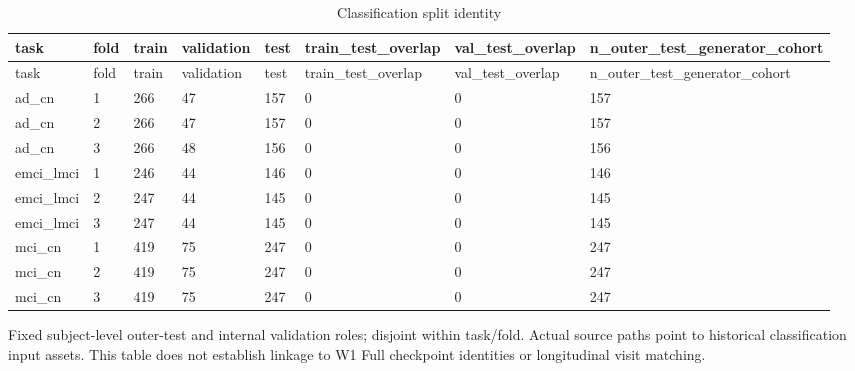 \begingroup
\footnotesize
\setlength{\tabcolsep}{4pt}
\begin{longtable}{llllllll}
\caption{Classification split identity}\label{tab:s-n22}\\
\toprule
task & fold & train & validation & test & train\_test\_overlap & val\_test\_overlap & n\_outer\_test\_generator\_cohort \\
\midrule
\endfirsthead
\toprule
task & fold & train & validation & test & train\_test\_overlap & val\_test\_overlap & n\_outer\_test\_generator\_cohort \\
\midrule
\endhead
\bottomrule
\endfoot
ad\_cn & 1 & 266 & 47 & 157 & 0 & 0 & 157 \\
ad\_cn & 2 & 266 & 47 & 157 & 0 & 0 & 157 \\
ad\_cn & 3 & 266 & 48 & 156 & 0 & 0 & 156 \\
emci\_lmci & 1 & 246 & 44 & 146 & 0 & 0 & 146 \\
emci\_lmci & 2 & 247 & 44 & 145 & 0 & 0 & 145 \\
emci\_lmci & 3 & 247 & 44 & 145 & 0 & 0 & 145 \\
mci\_cn & 1 & 419 & 75 & 247 & 0 & 0 & 247 \\
mci\_cn & 2 & 419 & 75 & 247 & 0 & 0 & 247 \\
mci\_cn & 3 & 419 & 75 & 247 & 0 & 0 & 247 \\
\end{longtable}
\noindent\parbox{\linewidth}{\footnotesize Fixed subject-level outer-test and internal validation roles; disjoint within task/fold. Actual source paths point to historical classification input assets. This table does not establish linkage to W1 Full checkpoint identities or longitudinal visit matching.}
\endgroup
